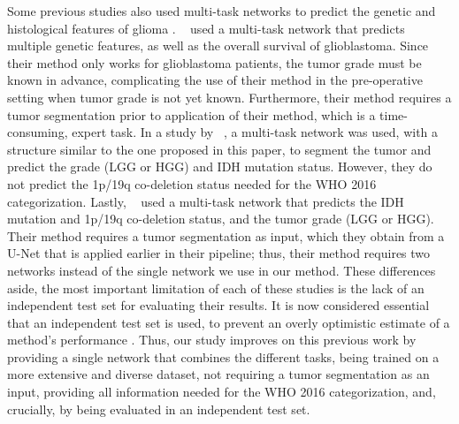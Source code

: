 Some previous studies also used multi-task networks to predict the genetic and histological features of glioma \autocite{tang2020multi, xue2020radiomicsmulti, decuyper2020automated}.
\citeauthor*{tang2020multi}~\autocite{tang2020multi} used a multi-task network that predicts multiple genetic features, as well as the overall survival of glioblastoma.
Since their method only works for glioblastoma patients, the tumor grade must be known in advance, complicating the use of their method in the pre-operative setting when tumor grade is not yet known.
Furthermore, their method requires a tumor segmentation prior to application of their method, which is a time-consuming, expert task.
In a study by \citeauthor*{xue2020radiomicsmulti}~\autocite{xue2020radiomicsmulti}, a multi-task network was used, with a structure similar to the one proposed in this paper, to segment the tumor and predict the grade (\gls{LGG} or \gls{HGG}) and \gls{IDH} mutation status.
However, they do not predict the 1p/19q co-deletion status needed for the \gls{WHO} 2016 categorization.
Lastly, \citeauthor*{decuyper2020automated}~\autocite{decuyper2020automated} used a multi-task network that predicts the \gls{IDH} mutation and 1p/19q co-deletion status, and the tumor grade (\gls{LGG} or \gls{HGG}).
Their method requires a tumor segmentation as input, which they obtain from a U-Net that is applied earlier in their pipeline; thus, their method requires two networks instead of the single network we use in our method.
These differences aside, the most important limitation of each of these studies is the lack of an independent test set for evaluating their results.
It is now considered essential that an independent test set is used, to prevent an overly optimistic estimate of a method's performance \autocite{gillies2016radiomics, rizzo2018radiomics, lohmann2020radiomics, yip2016applicationsradiomics}.
Thus, our study improves on this previous work by providing a single network that combines the different tasks, being trained on a more extensive and diverse dataset, not requiring a tumor segmentation as an input, providing all information needed for the WHO 2016 categorization, and, crucially, by being evaluated in an independent test set.

